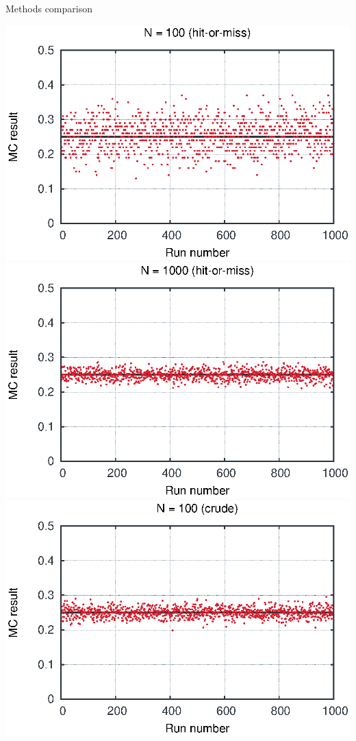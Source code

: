 
\begin{emptyslide}{Methods comparison}
\null\vfill

  \twocolumn
  {
    \includegraphics[width=\columnwidth]{img/int100.eps}
    \includegraphics[width=\columnwidth]{img/int1000.eps}
  }
  {
    \includegraphics[width=\columnwidth]{img/int2100.eps}
}
\end{emptyslide}
